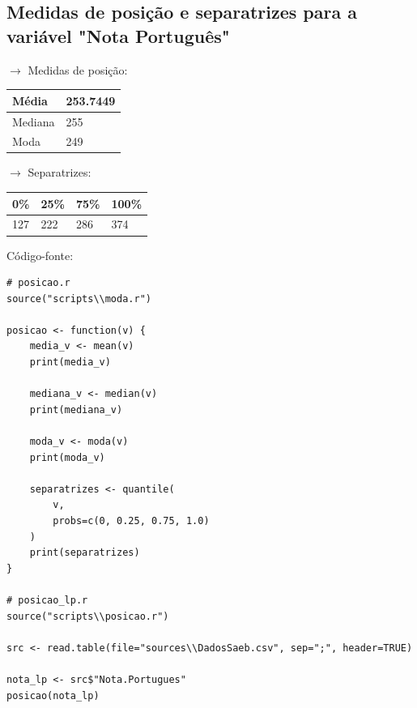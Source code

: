 \documentclass[17pt]{extarticle}
\begin{document}
\subsection{Medidas de posição e separatrizes para a variável "Nota Português"}
$\rightarrow$ Medidas de posição:
\begin{table}[H]
\begin{tabular}{|l|l|}
\hline
Média   & 253.7449 \\ \hline
Mediana & 255      \\ \hline
Moda    & 249      \\ \hline
\end{tabular}
\end{table}
\noindent
$\rightarrow$ Separatrizes:
\begin{table}[H]
\begin{tabular}{|l|l|l|l|}
\hline
0\% & 25\% & 75\% & 100\% \\ \hline
127 & 222  & 286  & 374   \\ \hline
\end{tabular}
\end{table}
\noindent
Código-fonte:
\begin{lstlisting}
# posicao.r
source("scripts\\moda.r")

posicao <- function(v) {
    media_v <- mean(v)
    print(media_v)

    mediana_v <- median(v)
    print(mediana_v)

    moda_v <- moda(v)
    print(moda_v)

    separatrizes <- quantile(
        v,
        probs=c(0, 0.25, 0.75, 1.0)
    )
    print(separatrizes)
}
    
# posicao_lp.r
source("scripts\\posicao.r")

src <- read.table(file="sources\\DadosSaeb.csv", sep=";", header=TRUE)

nota_lp <- src$"Nota.Portugues"
posicao(nota_lp)

\end{lstlisting}

\newpage
\end{document}
